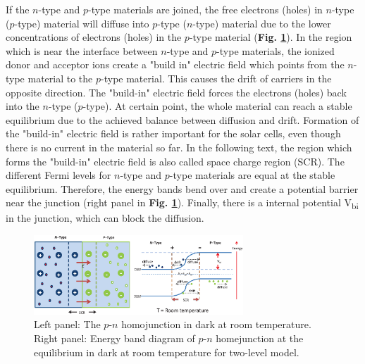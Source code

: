 \documentclass[a4paper, 12pt, titlepage,oneside,drop]{kthesis}
\begin{document}
If the $n$-type and $p$-type materials are joined, the free electrons (holes) in $n$-type ($p$-type) material will diffuse into $p$-type ($n$-type) material due to the
lower concentrations of electrons (holes) in the $p$-type material (\textbf{Fig. \ref{pnjunction}}). In the region which is near the interface between $n$-type and $p$-type materials, the ionized donor and acceptor ions create a
"build in" electric field which points from the $n$-type material to the $p$-type material. This causes the drift of carriers in the opposite direction. The "build-in" electric field forces the electrons (holes) back into
the $n$-type ($p$-type). At certain point, 
the whole material can reach a stable equilibrium due to the achieved balance between diffusion and drift. Formation of the "build-in" electric field is rather important for the solar cells, even though there is no current in 
the material so far. In the following text, the region which forms the "build-in" electric field is also called space charge region (SCR). The different Fermi levels for $n$-type and $p$-type materials are
equal at the stable equilibrium. Therefore, the energy bands bend over and create a potential barrier near the junction (right panel in \textbf{Fig. \ref{pnjunction}}). Finally, there is a internal potential V\textsubscript{bi}
in the junction, which can block the diffusion.

\begin{figure}[H]
    \begin{center}
            \includegraphics[width=0.7\textwidth]{pnjunction.eps}
     \end{center}
    \caption{Left panel: The $p$-$n$ homojunction in dark at room temperature. Right panel: Energy band diagram of $p$-$n$ homejunction at the equilibrium in dark at room temperature for two-level model. }      
    \label{pnjunction}
\end{figure}
\end{document}
